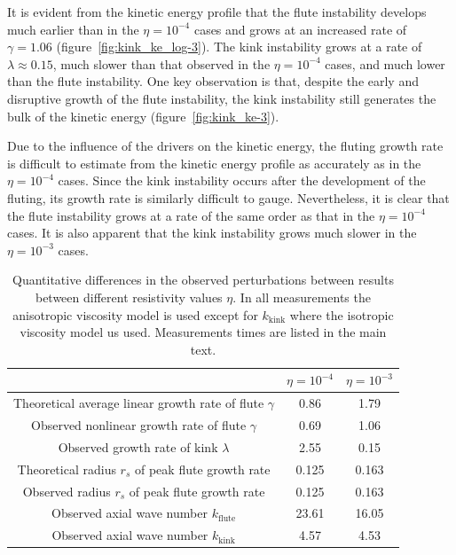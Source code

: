 \documentclass[fleqn,usenatbib]{mnras}
\newcommand{\rs}[2]{{#2}}
\begin{document}
It is evident from the kinetic energy profile that the \rs{fluting}{flute} instability develops much earlier than in the $\eta=10^{-4}$ cases and grows at an increased rate of $\gamma = 1.06$ (figure~\ref{fig:kink_ke_log-3}). The kink instability grows at a rate of $\lambda \approx 0.15$, much slower than that observed in the $\eta=10^{-4}$ cases, and much lower than the \rs{fluting}{flute} instability. One key observation is that, despite the early and disruptive growth of the \rs{fluting}{flute} instability, the kink instability still generates the bulk of the kinetic energy (figure~\ref{fig:kink_ke-3}).

Due to the influence of the drivers on the kinetic energy, the fluting growth rate is difficult to estimate from the kinetic energy profile as accurately as in the $\eta=10^{-4}$ cases. Since the kink instability occurs after the development of the fluting, its growth rate is similarly difficult to gauge. Nevertheless, it is clear that the \rs{fluting}{flute} instability grows at a rate of the same order as that in the $\eta=10^{-4}$ cases. It is also apparent that the kink instability grows much slower in the $\eta=10^{-3}$ cases.

\begin{table}
\caption{Quantitative differences in the observed perturbations
  between results \rs{for both values of}{between different
    resistivity values} $\eta$. \rs{}{In all measurements the
  anisotropic viscosity model is used except for $k_\text{kink}$ where the
  isotropic viscosity model us used. Measurements times are listed in
  the main text.}}
\centering
\begin{tabular}{ccc}
&
$\eta=10^{-4}$ &
$\eta=10^{-3}$ \\
\midrule
\rs{Predicted linear}{Theoretical average linear growth rate of flute} $\gamma$ & 0.86 & 1.79  \\
Observed nonlinear \rs{}{growth rate of flute} $\gamma$ & 0.69 & 1.06  \\
Observed \rs{}{growth rate of kink} $\lambda$ & 2.55 & 0.15\\
\midrule
\rs{}{Theoretical} radius $r_s$ of peak \rs{$\gamma$}{flute growth rate} & 0.125 & 0.163 \\
Observed \rs{}{radius} $r_s$ \rs{}{of peak flute growth rate} & 0.125 & 0.163 \\
\midrule
Observed \rs{}{axial wave number} $k_{\rs{flute}{\text{flute}}}$ & 23.61 & 16.05 \\
Observed \rs{}{axial wave number} $k_{\rs{kink}{\text{kink}}}$ & 4.57 & 4.53 \\
\end{tabular}
\label{tab:kink_fluting_params}
\end{table}
\end{document}
